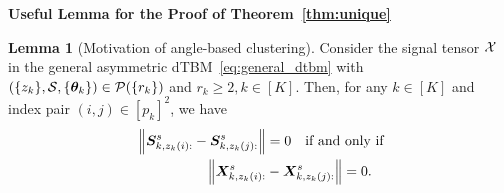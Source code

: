 \documentclass[journal]{IEEEtran}
\theoremstyle{definition}
\newtheorem{lem}{Lemma}
\theoremstyle{definition}
\begin{document}
{\bf Useful Lemma for the Proof of Theorem~\ref{thm:unique}} 

\begin{lem}[Motivation of angle-based clustering]\label{lem:angle} Consider the signal tensor $\mathcal{X}$ in the general asymmetric dTBM~\eqref{eq:general_dtbm} with $(\{z_k\},\mathcal{S},\{\boldsymbol{\theta}_k\})\in \mathcal{P}(\{r_k\})$ and $r_k \geq 2, k \in [K]$. Then, for any $k \in [K]$ and index pair $(i,j)\in[p_k]^2$, we have 
\begin{align}
     & \left\lVert \bm S_{k,z_k(i):}^s -  \bm S_{k,z_k(j):}^s \right\rVert = 0 \quad  \text{if and only if} \\
    & \quad \quad \quad \quad \quad  \left\lVert  \bm X_{k, z_k(i):}^s -  \bm X_{k,z_k(j):}^s \right\rVert = 0.
\end{align}
\end{lem}
\end{document}
